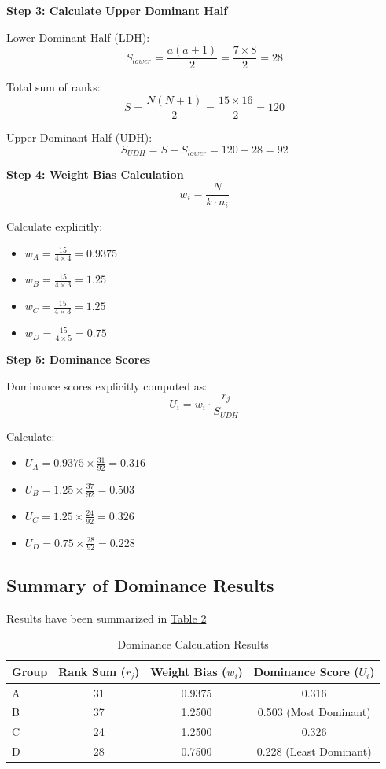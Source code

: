 \documentclass[man,floatsintext]{apa7}
\begin{document}
\textbf{Step 3: Calculate Upper Dominant Half}

Lower Dominant Half (LDH):
\begin{equation}
S_{lower} = \frac{a(a+1)}{2} = \frac{7 \times 8}{2} = 28
\end{equation}

Total sum of ranks:
\begin{equation}
S = \frac{N(N+1)}{2} = \frac{15 \times 16}{2} = 120
\end{equation}

Upper Dominant Half (UDH):
\begin{equation}
S_{UDH} = S - S_{lower} = 120 - 28 = 92
\end{equation}

\textbf{Step 4: Weight Bias Calculation}
\begin{equation}
w_i = \frac{N}{k \cdot n_i}
\end{equation}

Calculate explicitly:
\begin{itemize}
\item $w_A = \frac{15}{4 \times 4} = 0.9375$
\item $w_B = \frac{15}{4 \times 3} = 1.25$
\item $w_C = \frac{15}{4 \times 3} = 1.25$
\item $w_D = \frac{15}{4 \times 5} = 0.75$
\end{itemize}

\textbf{Step 5: Dominance Scores}

Dominance scores explicitly computed as:
\begin{equation}
U_i = w_i \cdot \frac{r_j}{S_{UDH}}
\end{equation}

Calculate:
\begin{itemize}
\item $U_A = 0.9375 \times \frac{31}{92} = 0.316$
\item $U_B = 1.25 \times \frac{37}{92} = 0.503$
\item $U_C = 1.25 \times \frac{24}{92} = 0.326$
\item $U_D = 0.75 \times \frac{28}{92} = 0.228$
\end{itemize}

\subsection{Summary of Dominance Results}
Results have been summarized in \hyperref[dominance-result]{Table 2}
\begin{table}[htb!]
\centering
\caption{Dominance Calculation Results}
\begin{tabular}{lccc}
\toprule
Group & Rank Sum ($r_j$) & Weight Bias ($w_i$) & Dominance Score ($U_i$) \\
\midrule
A & 31 & 0.9375 & 0.316 \\
B & 37 & 1.2500 & 0.503 (Most Dominant) \\
C & 24 & 1.2500 & 0.326 \\
D & 28 & 0.7500 & 0.228 (Least Dominant) \\
\bottomrule
\end{tabular}
\label{dominance-result}
\end{table}
\end{document}
